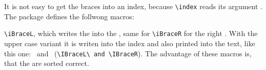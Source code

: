 \documentclass[ngerman]{article}
\providecommand\phantomsection{}
\begin{document}
It is not easy to get the braces into an index, because \verb+\index+ reads its argument .
The package defines the follwong macros:

\verb+\iBraceL+, which writes the \IBraceL{} into the , same for \verb+\iBraceR+ for the right \IBraceR.
With the upper case variant it is writen into the index and also printed into the text,
like this one: \IBraceL\ and \IBraceR\ (\verb|\IBraceL\ and \IBraceR|). The advantage of these macros is, that
the  are sorted correct.

\clearpage
\phantomsection
{}
\printindex
\end{document}
